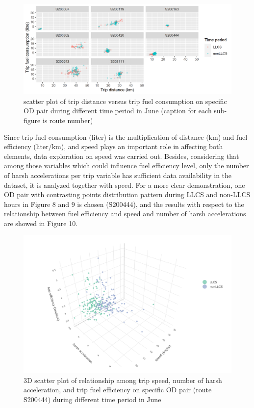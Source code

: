 \documentclass[preprint,12pt,3p]{elsarticle}
\begin{document}
\begin{figure}[H] %
\centering %

\includegraphics[scale=0.9]{selecteroute_dist_fuel.png} %
\caption{scatter plot of trip distance versus trip fuel consumption on specific OD pair during different time period in June (caption for each sub-figure is route number)} 
\label{fig9}
\end{figure}


Since trip fuel consumption (liter) is the multiplication of distance (km) and fuel efficiency (liter/km), and speed plays an important role in affecting both elements, data exploration on speed was carried out. Besides, considering that among those variables which could influence fuel efficiency level, only the number of harsh accelerations per trip variable has sufficient data availability in the dataset, it is analyzed together with speed. For a more clear demonstration, one OD pair with contrasting points distribution pattern during LLCS and non-LLCS hours in Figure 8 and 9 is chosen (S200444), and the results with respect to the relationship between fuel efficiency and speed and number of harsh accelerations are showed in Figure 10. 


\begin{figure}[H] %
\centering %

\includegraphics[width=1.0\textwidth]{3d_vafe.png} %
\caption{3D scatter plot of relationship among trip speed, number of harsh acceleration, and trip fuel efficiency on specific OD pair (route S200444) during different time period in June} 
\label{fig10}
\end{figure}
\end{document}
